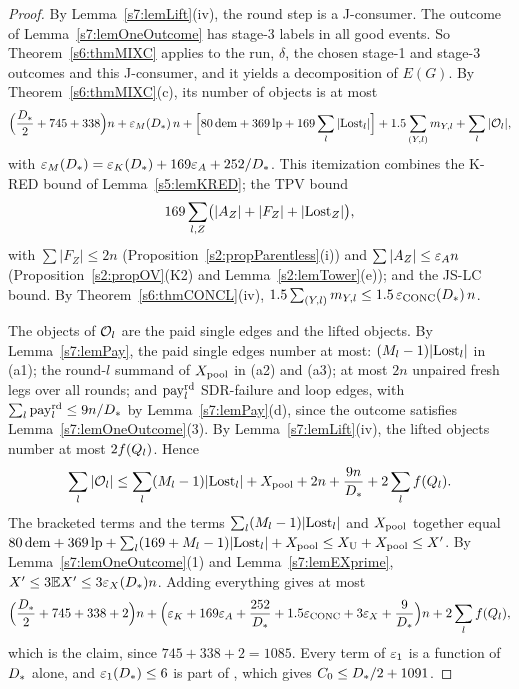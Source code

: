 \begin{proof}
By Lemma~\ref{s7:lemLift}(iv), the round step is a J-consumer. The outcome of
Lemma~\ref{s7:lemOneOutcome} has stage-3 labels in all good events. So
Theorem~\ref{s6:thmMIXC} applies to the run, $\delta$, the chosen stage-1 and
stage-3 outcomes and this J-consumer, and it yields a decomposition of $E(G)$. By
Theorem~\ref{s6:thmMIXC}(c), its number of objects is at most
\[
\Bigl(\frac{D_{*}}2+745+338\Bigr)n+\varepsilon_M(D_{*})\,n
+\Bigl[80\,\mathrm{dem}+369\,\mathrm{lp}+169\sum_l|\mathrm{Lost}_l|\Bigr]
+1.5\sum_{(Y,l)}m_{Y,l}+\sum_l|\mathcal{O}_l| ,
\]
with $\varepsilon_M(D_{*})=\varepsilon_{K}(D_{*})+169\varepsilon_{A}+252/D_{*}$. This itemization
combines the K-RED bound of Lemma~\ref{s5:lemKRED}; the TPV bound
\[
169\sum_{l,Z}\bigl(|A_Z|+|F_Z|+|\mathrm{Lost}_Z|\bigr),
\]
with $\sum|F_Z|\le2n$ (Proposition~\ref{s2:propParentless}(i)) and
$\sum|A_Z|\le\varepsilon_{A} n$ (Proposition~\ref{s2:propOV}(K2) and
Lemma~\ref{s2:lemTower}(e)); and the JS-LC bound. By
Theorem~\ref{s6:thmCONCL}(iv),
$1.5\sum_{(Y,l)}m_{Y,l}\le1.5\,\varepsilon_{\mathrm{CONC}}(D_{*})\,n$.

The objects of $\mathcal{O}_l$ are the paid single edges and the lifted objects. By
Lemma~\ref{s7:lemPay}, the paid single edges number at most:
$(M_l-1)|\mathrm{Lost}_l|$ in (a1); the round-$l$ summand of $X_{\mathrm{pool}}$ in (a2) and (a3);
at most $2n$ unpaired fresh legs over all rounds; and $\mathrm{pay}^{\mathrm{rd}}_l$ SDR-failure and
loop edges, with $\sum_l\mathrm{pay}^{\mathrm{rd}}_l\le9n/D_{*}$ by Lemma~\ref{s7:lemPay}(d), since
the outcome satisfies Lemma~\ref{s7:lemOneOutcome}(3). By
Lemma~\ref{s7:lemLift}(iv), the lifted objects number at most $2f(Q_l)$. Hence
\[
\sum_l|\mathcal{O}_l|\le\sum_l(M_l-1)|\mathrm{Lost}_l|+X_{\mathrm{pool}}+2n+\frac{9n}{D_{*}}+2\sum_lf(Q_l).
\]
The bracketed terms and the terms $\sum_l(M_l-1)|\mathrm{Lost}_l|$ and $X_{\mathrm{pool}}$ together
equal
$80\,\mathrm{dem}+369\,\mathrm{lp}+\sum_l(169+M_l-1)|\mathrm{Lost}_l|+X_{\mathrm{pool}}\le X_{\mathrm{U}}+X_{\mathrm{pool}}\le X'$.
By Lemma~\ref{s7:lemOneOutcome}(1) and Lemma~\ref{s7:lemEXprime},
$X'\le3\mathbb{E}X'\le3\varepsilon_{X}(D_{*})n$. Adding everything gives at most
\[
\Bigl(\frac{D_{*}}2+745+338+2\Bigr)n
+\Bigl(\varepsilon_{K}+169\varepsilon_{A}+\frac{252}{D_{*}}+1.5\varepsilon_{\mathrm{CONC}}+3\varepsilon_{X}+\frac9{D_{*}}\Bigr)n
+2\sum_lf(Q_l),
\]
which is the claim, since $745+338+2=1085$. Every term of $\varepsilon_{1}$ is a function
of $D_{*}$ alone, and $\varepsilon_{1}(D_{*})\le6$ is part
of , which gives $C_{0}\le D_{*}/2+1091$.
\end{proof}

